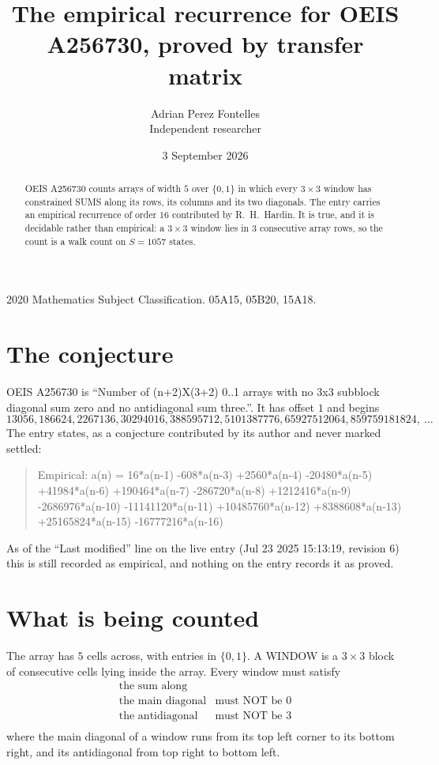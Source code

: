 \documentclass[11pt,a4paper]{article}
\title{The empirical recurrence for OEIS A256730, proved by transfer matrix}
\author{Adrian Perez Fontelles\\ \small Independent researcher}
\date{3 September 2026}
\theoremstyle{plain}
\theoremstyle{definition}
\begin{document}
\maketitle

\begin{abstract}
OEIS A256730 counts arrays of width $5$ over $\{0,1\}$ in which every $3\times3$ window has
constrained SUMS along its rows, its columns and its two diagonals. The entry carries an
empirical recurrence of order $16$ contributed by R.~H.~Hardin. It is true, and it is
decidable rather than empirical: a $3\times3$ window lies in $3$ consecutive array rows,
so the count is a walk count on $S=1057$ states.
\end{abstract}

\noindent\small 2020 Mathematics Subject Classification. 05A15, 05B20, 15A18.\normalsize

\section{The conjecture}

OEIS A256730 is ``Number of (n+2)X(3+2) 0..1 arrays with no 3x3 subblock diagonal sum zero and no antidiagonal sum three.''. It has offset $1$ and begins
\[
13056, 186624, 2267136, 30294016, 388595712, 5101387776, 65927512064, 859759181824,\ \dots
\]
The entry states, as a conjecture contributed by its author and never marked settled:
\begin{quote}
Empirical: a(n) = 16*a(n-1) -608*a(n-3) +2560*a(n-4) -20480*a(n-5) +41984*a(n-6) +190464*a(n-7) -286720*a(n-8) +1212416*a(n-9) -2686976*a(n-10) -11141120*a(n-11) +10485760*a(n-12) +8388608*a(n-13) +25165824*a(n-15) -16777216*a(n-16)
\end{quote}
As of the ``Last modified'' line on the live entry (Jul 23 2025 15:13:19, revision 6) this is still
recorded as empirical, and nothing on the entry records it as proved.

\section{What is being counted}

The array has $5$ cells across, with entries in $\{0,1\}$. A WINDOW is a $3\times3$ block
of consecutive cells lying inside the array. Every window must satisfy
\[
\begin{array}{ll}
\text{the sum along} & \text{} \\[2pt]
\text{the main diagonal} & \text{must NOT be 0} \\
\text{the antidiagonal} & \text{must NOT be 3} \\
\end{array}
\]
where the main diagonal of a window runs from its top left corner to its bottom right, and its
antidiagonal from top right to bottom left.
\end{document}
